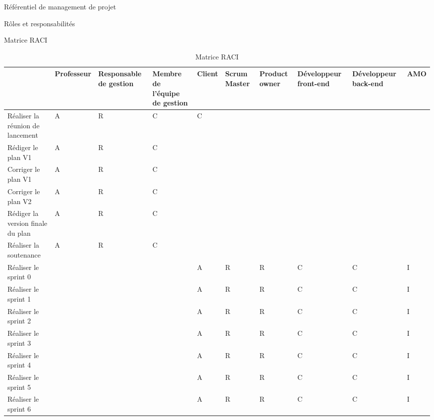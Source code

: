 \documentclass[]{article}
\begin{document}
{\begin{section}{\label{sec:Référentiel de management de projet}Référentiel de management de projet}
\begin{subsection}{\label{sec:Rôles et responsabilités}Rôles et responsabilités}
\begin{subsubsection}{\label{sec:Matrice RACI}Matrice RACI}
             \begin{landscape}
                \begin{table}[H]
                    \caption{Matrice RACI}
                    \fontsize{8pt}{9pt}\selectfont
                    \begin{tabularx}{\columnwidth}{|X|X|X|X|X|X|X|X|X|X|}
                        \hline
                        & Professeur & Responsable de gestion & Membre de l'équipe de gestion & Client & Scrum Master & Product owner & Développeur front-end & Développeur back-end & AMO\\
                        \hline
                        Réaliser la réunion de lancement & A & R & C & C &  &  &  &  & \\
                        \hline
                        Rédiger le plan V1& A & R & C &  &  &  &  &  & \\
                        \hline
                        Corriger le plan V1& A & R & C &  &  &  &  &  & \\
                        \hline
                        Corriger le plan V2& A & R & C  &  &  &  &  &  & \\
                        \hline
                        Rédiger la version finale du plan& A & R & C  &  &  &  &  &  & \\
                        \hline
                        Réaliser la soutenance& A & R & C  &  &  &  &  &  & \\
                        \hline
                        Réaliser le sprint 0&  &  &  & A & R & R & C & C & I\\
                        \hline
                        Réaliser le sprint 1&  &  &  & A & R & R & C & C & I\\
                        \hline
                        Réaliser le sprint 2&  &  &  & A & R & R & C & C & I\\
                        \hline
                        Réaliser le sprint 3&  &  &  & A & R & R & C & C & I\\
                        \hline
                        Réaliser le sprint 4&  &  &  & A & R & R & C & C & I\\
                        \hline
                        Réaliser le sprint 5&  &  &  & A & R & R & C & C & I\\
                        \hline
                        Réaliser le sprint 6&  &  &  & A & R & R & C & C & I\\
                        \hline
                    \end{tabularx}
                \end{table}
             \end{landscape}
         \end{subsubsection}
     \end{subsection}


\end{section}}
\end{document}

